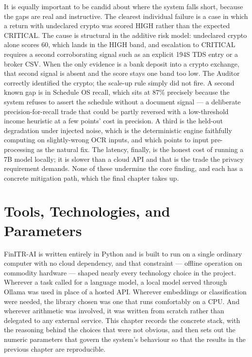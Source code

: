 \documentclass[12pt, a4paper, oneside]{report}
\begin{document}
It is equally important to be candid about where the system falls short, because
the gaps are real and instructive. The clearest individual failure is a case in
which a return with undeclared crypto was scored HIGH rather than the expected
CRITICAL. The cause is structural in the additive risk model: undeclared crypto
alone scores 60, which lands in the HIGH band, and escalation to CRITICAL
requires a second corroborating signal such as an explicit 194S TDS entry or a
broker CSV. When the only evidence is a bank deposit into a crypto exchange,
that second signal is absent and the score stays one band too low. The Auditor
correctly identified the crypto; the scale-up rule simply did not fire. A second
known gap is in Schedule OS recall, which sits at 87\% precisely because the
system refuses to assert the schedule without a document signal --- a deliberate
precision-for-recall trade that could be partly reversed with a low-threshold
income heuristic at a few points' cost in precision. A third is the held-out
degradation under injected noise, which is the deterministic engine faithfully
computing on slightly-wrong OCR inputs, and which points to input pre-processing
as the natural fix. The latency, finally, is the honest cost of running a 7B
model locally; it is slower than a cloud API and that is the trade the privacy
requirement demands. None of these undermine the core finding, and each has a
concrete mitigation path, which the final chapter takes up.



\chapter{Tools, Technologies, and Parameters}
\label{chap:tools}

FinITR-AI is written entirely in Python and is built to run on a single ordinary
computer with no cloud dependency, and that constraint --- offline operation on
commodity hardware --- shaped nearly every technology choice in the project.
Wherever a task called for a language model, a local model served through Ollama
was used in place of a hosted API. Wherever embeddings or classification were
needed, the library chosen was one that runs comfortably on a CPU. And wherever
arithmetic was involved, it was written from scratch rather than delegated to any
external service. This chapter records the concrete stack, with the reasoning
behind the choices that were not obvious, and then sets out the numeric
parameters that govern the system's behaviour so that the results in the
previous chapter are reproducible.
\end{document}
